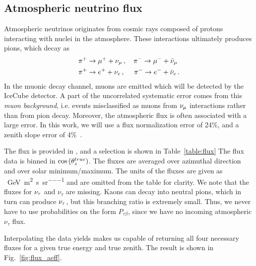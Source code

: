\subsection{Atmospheric neutrino flux}
Atmospheric neutrinos originates from cosmic rays composed of protons interacting with nuclei in the atmosphere.
These interactions ultimately produces pions, which decay as 
\begin{align}\label{eq:pion}
    &\pi^+ \to \mu^+ + \nu_\mu\,, \quad \pi^- \to \mu^- + \bar{\nu}_\mu \nonumber \\
    &\pi^+ \to e^+ + \nu_e\,,\,\, \quad \pi^- \to e^- + \bar{\nu}_e\,.
\end{align}
In the muonic decay channel, muons are emitted which will be detected by the IceCube detector. A part of the 
uncorrelated systematic error comes from this \emph{muon background}, i.e. events misclassified as muons from 
$\nu_\mu$ interactions rather than from pion decay. Moreover, the atmospheric flux is often associated with a large error.
In this work, we will use a flux normalization error of 24\%, and a zenith slope error of 4\%~\cite{hondapaper}.

The flux is provided in \cite{hondaData,hondaArticle}, and a selection is shown in Table~\ref{table:flux}
The flux data is binned in $\cos{(\theta_z^{true})}$. The fluxes are averaged over azimuthal direction and over solar minimum/maximum. 
The units of the fluxes are given as \si{\per\GeV \per\metre\squared \per\second \per\steradian} and are omitted
from the table for clarity. 
We note that the fluxes for $\nu_\tau$ and $\nu_{\bar{\tau}}$ are missing. Kaons can decay into neutral pions, which in turn 
can produce $\nu_\tau$, but this branching ratio is extremely small. Thus, we never have to use probabilities on the form 
$P_{\tau \beta}$, since we have no incoming atmospheric $\nu_\tau$ flux. 

Interpolating the data yields makes us capable of returning all four necessary fluxes for a given true energy and true zenith.
The result is shown in Fig.~\ref{fig:flux_aeff}.

